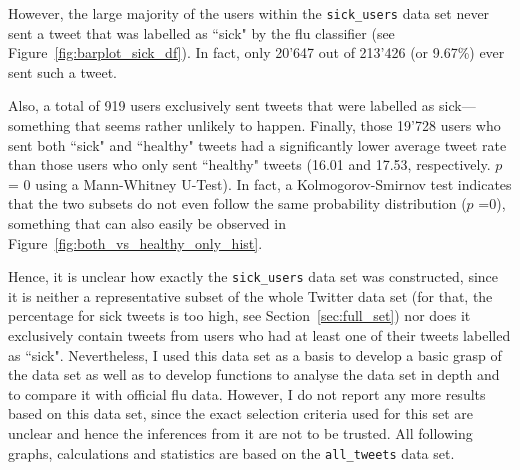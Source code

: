\documentclass[11pt, a4paper,twoside]{report}\usepackage[]{graphicx}\usepackage[]{color}
\begin{document}
However, the large majority of the users within the \texttt{sick\_users} data set never sent a tweet that was labelled as ``sick" by the flu classifier (see Figure~\ref{fig:barplot_sick_df}). In fact, only 20'647 out of 213'426 (or 9.67\%) ever sent such a tweet.

Also, a total of 919 users exclusively sent tweets that were labelled as sick---something that seems rather unlikely to happen. Finally, those 19'728 users who sent both ``sick" and ``healthy" tweets had a significantly lower average tweet rate than those users who only sent ``healthy" tweets (16.01 and 17.53, respectively. $p$ = 0 using a Mann-Whitney U-Test). In fact, a Kolmogorov-Smirnov test indicates that the two subsets do not even follow the same probability distribution ($p$ =0), something that can also easily be observed in Figure~\ref{fig:both_vs_healthy_only_hist}.

Hence, it is unclear how exactly the \texttt{sick\_users} data set was constructed, since it is neither a representative subset of the whole Twitter data set (for that, the percentage for sick tweets is too high, see Section~\ref{sec:full_set}) nor does it exclusively contain tweets from users who had at least one of their tweets labelled as ``sick". Nevertheless, I used this data set as a basis to develop a basic grasp of the data set as well as to develop functions to analyse the data set in depth and to compare it with official flu data. However, I do not report any more results based on this data set, since the exact selection criteria used for this set are unclear and hence the inferences from it are not to be trusted. All following graphs, calculations and statistics are based on the \texttt{all\_tweets} data set.\clearpage
\end{document}
